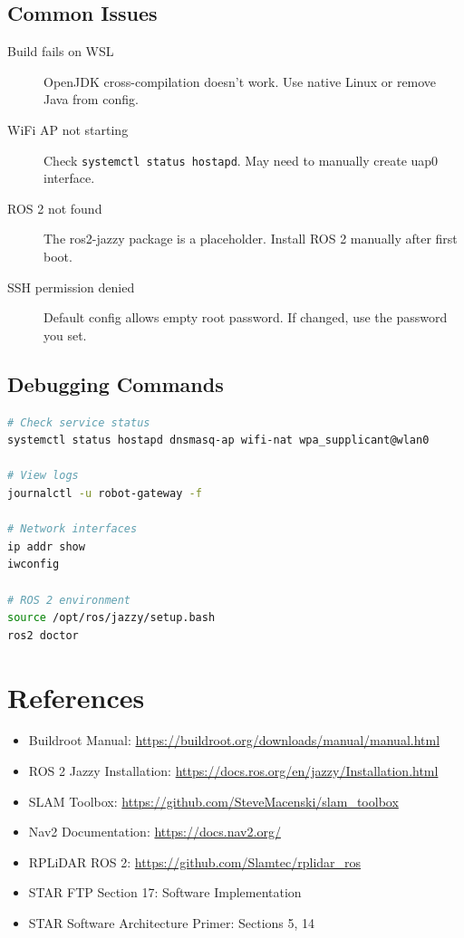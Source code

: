 \subsection{Common Issues}

\begin{description}
    \item[Build fails on WSL] OpenJDK cross-compilation doesn't work. Use native Linux or remove Java from config.

    \item[WiFi AP not starting] Check \texttt{systemctl status hostapd}. May need to manually create uap0 interface.

    \item[ROS 2 not found] The ros2-jazzy package is a placeholder. Install ROS 2 manually after first boot.

    \item[SSH permission denied] Default config allows empty root password. If changed, use the password you set.
\end{description}

\subsection{Debugging Commands}

\begin{lstlisting}[language=bash]
# Check service status
systemctl status hostapd dnsmasq-ap wifi-nat wpa_supplicant@wlan0

# View logs
journalctl -u robot-gateway -f

# Network interfaces
ip addr show
iwconfig

# ROS 2 environment
source /opt/ros/jazzy/setup.bash
ros2 doctor
\end{lstlisting}

\section{References}

\begin{itemize}
    \item Buildroot Manual: \url{https://buildroot.org/downloads/manual/manual.html}
    \item ROS 2 Jazzy Installation: \url{https://docs.ros.org/en/jazzy/Installation.html}
    \item SLAM Toolbox: \url{https://github.com/SteveMacenski/slam_toolbox}
    \item Nav2 Documentation: \url{https://docs.nav2.org/}
    \item RPLiDAR ROS 2: \url{https://github.com/Slamtec/rplidar_ros}
    \item STAR FTP Section 17: Software Implementation
    \item STAR Software Architecture Primer: Sections 5, 14
\end{itemize}

